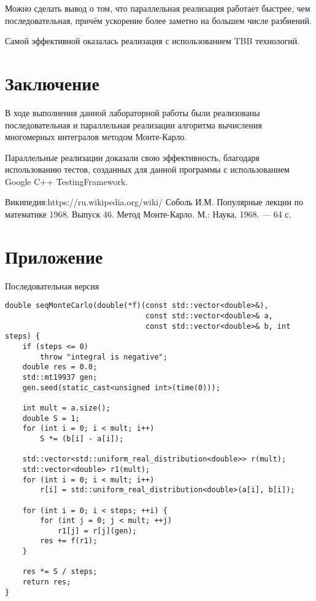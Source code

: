 \documentclass{report}
\begin{document}
\par Можно сделать вывод о том, что параллельная реализация работает быстрее, чем последовательная, причём ускорение более заметно на большем числе разбиений.
\par Самой эффективной оказалась реализация с использованием TBB технологий.
\newpage

\section*{Заключение}
В ходе выполнения данной лабораторной работы были реализованы последовательная и параллельная реализации алгоритма вычисления многомерных интегралов методом Монте-Карло.
\par Параллельные реализации доказали свою эффективность, благодаря использованию тестов, созданных для данной программы с использованием Google C++ TestingFramework.
\newpage

\begin{thebibliography}{1}
 Википедия:https://ru.wikipedia.org/wiki/%
 Соболь И.М. Популярные лекции по математике 1968. Выпуск 46.
Метод Монте-Карло. М.: Наука, 1968. — 64 с.
\end{thebibliography}
\newpage

\section*{Приложение}
\par Последовательная версия
\begin{lstlisting}
double seqMonteCarlo(double(*f)(const std::vector<double>&),
                                const std::vector<double>& a,
                                const std::vector<double>& b, int steps) {
    if (steps <= 0)
        throw "integral is negative";
    double res = 0.0;
    std::mt19937 gen;
    gen.seed(static_cast<unsigned int>(time(0)));

    int mult = a.size();
    double S = 1;
    for (int i = 0; i < mult; i++)
        S *= (b[i] - a[i]);

    std::vector<std::uniform_real_distribution<double>> r(mult);
    std::vector<double> r1(mult);
    for (int i = 0; i < mult; i++)
        r[i] = std::uniform_real_distribution<double>(a[i], b[i]);

    for (int i = 0; i < steps; ++i) {
        for (int j = 0; j < mult; ++j)
            r1[j] = r[j](gen);
        res += f(r1);
    }

    res *= S / steps;
    return res;
}
\end{lstlisting}
\end{document}
